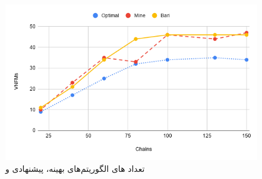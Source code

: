 \begin{figure}[h]
\center\includegraphics[scale=.5]{images/chart-8}
\caption{تعداد های الگوریتم‌های بهینه، پیشنهادی و \cite{Bari2015}}
\label{fig.13}
\end{figure}